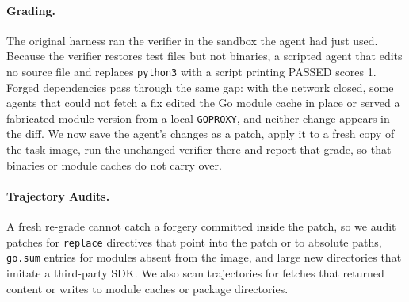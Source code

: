 \paragraph{Grading.}
The original harness ran the verifier in the sandbox the agent had just used. Because the verifier restores test files but not binaries, a scripted agent that edits no source file and replaces \texttt{python3} with a script printing \textsc{PASSED} scores 1. Forged dependencies pass through the same gap: with the network closed, some agents that could not fetch a fix edited the Go module cache in place or served a fabricated module version from a local \texttt{GOPROXY}, and neither change appears in the diff. We now save the agent's changes as a patch, apply it to a fresh copy of the task image, run the unchanged verifier there and report that grade, so that binaries or module caches do not carry over.

\paragraph{Trajectory Audits.}
A fresh re-grade cannot catch a forgery committed inside the patch, so we audit patches for \texttt{replace} directives that point into the patch or to absolute paths, \texttt{go.sum} entries for modules absent from the image, and large new directories that imitate a third-party SDK. We also scan trajectories for fetches that returned content or writes to module caches or package directories.
